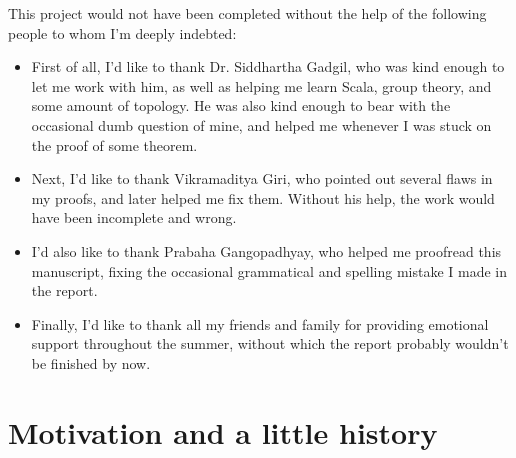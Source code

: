 \documentclass[12pt, titlepage]{article}
\theoremstyle{definition}
\begin{document}
This project would not have been completed without the help of the following people to whom I'm deeply indebted:
\begin{itemize}
\item First of all, I'd like to thank Dr. Siddhartha Gadgil, who was kind enough to let me work with him, as well as helping me learn Scala, group theory, and some amount of topology. He was also kind enough to bear with the occasional dumb question of mine, and helped me whenever I was stuck on the proof of some theorem.
\item Next, I'd like to thank Vikramaditya Giri, who pointed out several flaws in my proofs, and later helped me fix them. Without his help, the work would have been incomplete and wrong.
\item I'd also like to thank Prabaha Gangopadhyay, who helped me proofread this manuscript, fixing the occasional grammatical and spelling mistake I made in the report.
\item  Finally, I'd like to thank all my friends and family for providing emotional support throughout the summer, without which the report probably wouldn't be finished by now.
\end{itemize}


\thispagestyle{empty}

\clearpage

\tableofcontents

\newpage

\section{Motivation and a little history}\label{intro}
\end{document}
